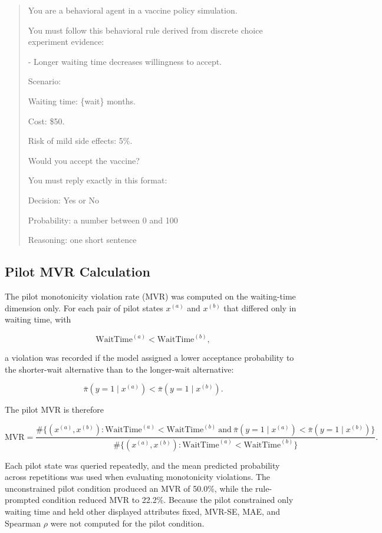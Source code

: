 \documentclass[11pt]{article}
\begin{document}
\begin{quote}
\small
You are a behavioral agent in a vaccine policy simulation.

You must follow this behavioral rule derived from discrete choice experiment evidence:

- Longer waiting time decreases willingness to accept.

Scenario:

Waiting time: \{wait\} months.

Cost: \$50.

Risk of mild side effects: 5\%.

Would you accept the vaccine?

You must reply exactly in this format:

Decision: Yes or No

Probability: a number between 0 and 100

Reasoning: one short sentence
\end{quote}

\subsection{Pilot MVR Calculation}

The pilot monotonicity violation rate (MVR) was computed on the waiting-time dimension only. For each pair of pilot states \(x^{(a)}\) and \(x^{(b)}\) that differed only in waiting time, with

\[
\text{WaitTime}^{(a)} < \text{WaitTime}^{(b)},
\]

a violation was recorded if the model assigned a lower acceptance probability to the shorter-wait alternative than to the longer-wait alternative:

\[
\bar{\pi}(y=1 \mid x^{(a)})
<
\bar{\pi}(y=1 \mid x^{(b)}).
\]

The pilot MVR is therefore

\[
\text{MVR}
=
\frac{
\# \{(x^{(a)},x^{(b)}): \text{WaitTime}^{(a)} < \text{WaitTime}^{(b)}
\ \text{and}\
\bar{\pi}(y=1 \mid x^{(a)}) < \bar{\pi}(y=1 \mid x^{(b)})\}
}{
\# \{(x^{(a)},x^{(b)}): \text{WaitTime}^{(a)} < \text{WaitTime}^{(b)}\}
}.
\]

Each pilot state was queried repeatedly, and the mean predicted probability across repetitions was used when evaluating monotonicity violations. The unconstrained pilot condition produced an MVR of 50.0\%, while the rule-prompted condition reduced MVR to 22.2\%. Because the pilot constrained only waiting time and held other displayed attributes fixed, MVR-SE, MAE, and Spearman \(\rho\) were not computed for the pilot condition.
\end{document}

